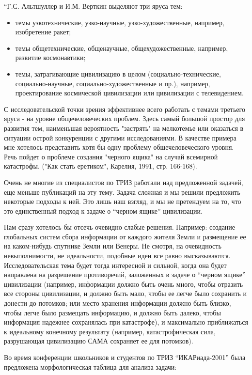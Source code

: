 \documentclass[11pt,a4paper]{article}
\begin{document}
“Г.С. Альтшуллер и И.М. Верткин выделяют три яруса тем:
\begin{itemize}[noitemsep]
\item темы узкотехнические, узко-научные, узко-художественные, например,
  изобретение ракет;
\item темы общетехнические, общенаучные, общехудожественные, например,
  развитие космонавтики;
\item темы, затрагивающие цивилизацию в целом (социально-технические,
  социально-научные, социально-художественные и пр.), например, проектирование
  космической цивилизации или цивилизации с телевидением.
\end{itemize}
С исследовательской точки зрения эффективнее всего работать с темами третьего
яруса - на уровне общечеловеческих проблем. Здесь самый большой простор для
развития тем, наименьшая вероятность "застрять" на мелкотемье или оказаться в
ситуации острой конкуренции с другими исследованиями. В качестве примера мне
хотелось представить хотя бы одну проблему общечеловеческого уровня. Речь
пойдет о проблеме создания "черного ящика" на случай всемирной катастрофы.
("Как стать еретиком", Карелия, 1991, стр. 166-168).

Очень не многие из специалистов по ТРИЗ работали над предложенной задачей, еще
меньше публикаций на эту тему. Задача сложная и мы решили предложить некоторые
подходы к ней. Это лишь наш взгляд, и мы не претендуем на то, что это
единственный подход к задаче о “черном ящике” цивилизации.

Нам сразу хотелось бы отсечь очевидно слабые решения. Например: создание
глобальных систем сбора информации от каждого жителя Земли и размещение ее на
каком-нибудь спутнике Земли или Венеры. Не смотря, на очевидность
невыполнимости, не идеальности, подобные идеи все равно
высказываются. Исследовательская тема будет тогда интересной и сильной, когда
она будет направлена на разрешение противоречий, заложенных в задаче о “черном
ящике” цивилизации (например, информации должно быть очень много, чтобы
отразить все стороны цивилизации, и должно быть мало, чтобы ее легче было
сохранить и донести до потомков; или место хранения информации должно быть
близко, чтобы легче было размещать информацию, и должно быть далеко, чтобы
информация надежнее сохранялась при катастрофе), и максимально приближаться к
идеальному конечному результату (например, катастрофическая сила, разрушающая
цивилизацию САМА сохраняет ее для потомков).

Во время конференции школьников и студентов по ТРИЗ “ИКАРиада-2001” была
предложена морфологическая таблица для анализа задачи:
\end{document}
